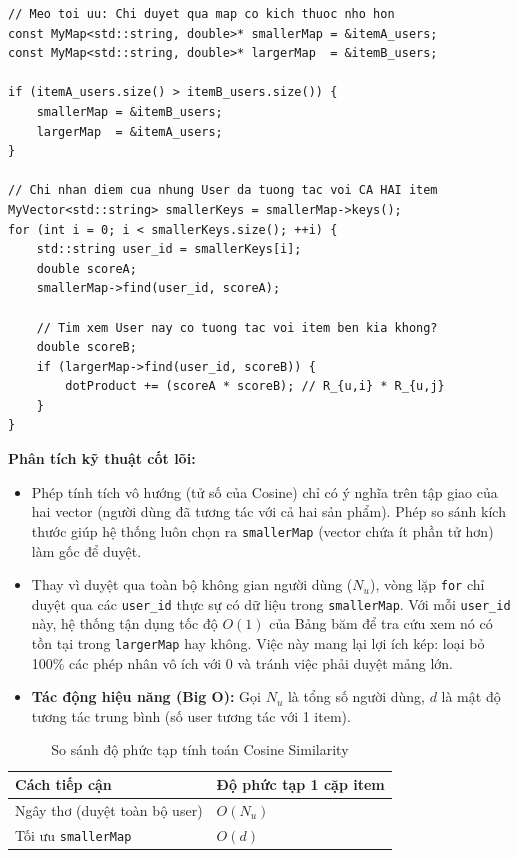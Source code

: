 \documentclass{report}
\begin{document}
\begin{lstlisting}[caption={Kỹ thuật smallerMap trong SimilarityMatrix::calculateCosine() (File SimilarityMatrix.cpp)}, label={lst:smallermap}]
// Meo toi uu: Chi duyet qua map co kich thuoc nho hon
const MyMap<std::string, double>* smallerMap = &itemA_users;
const MyMap<std::string, double>* largerMap  = &itemB_users;

if (itemA_users.size() > itemB_users.size()) {
    smallerMap = &itemB_users;
    largerMap  = &itemA_users;
}

// Chi nhan diem cua nhung User da tuong tac voi CA HAI item
MyVector<std::string> smallerKeys = smallerMap->keys();
for (int i = 0; i < smallerKeys.size(); ++i) {
    std::string user_id = smallerKeys[i];
    double scoreA;
    smallerMap->find(user_id, scoreA);

    // Tim xem User nay co tuong tac voi item ben kia khong?
    double scoreB;
    if (largerMap->find(user_id, scoreB)) {
        dotProduct += (scoreA * scoreB); // R_{u,i} * R_{u,j}
    }
}
\end{lstlisting}

\vspace{0.3cm}
\textbf{Phân tích kỹ thuật cốt lõi:}
\begin{itemize}
    \item[\textbf{a)}] Phép tính tích vô hướng (tử số của Cosine) chỉ có ý nghĩa trên tập giao của hai vector (người dùng đã tương tác với cả hai sản phẩm). Phép so sánh kích thước giúp hệ thống luôn chọn ra \texttt{smallerMap} (vector chứa ít phần tử hơn) làm gốc để duyệt.
    \item[\textbf{b)}] Thay vì duyệt qua toàn bộ không gian người dùng ($N_u$), vòng lặp \texttt{for} chỉ duyệt qua các \texttt{user\_id} thực sự có dữ liệu trong \texttt{smallerMap}. Với mỗi \texttt{user\_id} này, hệ thống tận dụng tốc độ $O(1)$ của Bảng băm để tra cứu xem nó có tồn tại trong \texttt{largerMap} hay không. Việc này mang lại lợi ích kép: loại bỏ 100\% các phép nhân vô ích với 0 và tránh việc phải duyệt mảng lớn.
    \item[\textbf{c)}] \textbf{Tác động hiệu năng (Big O):} Gọi $N_u$ là tổng số người dùng, $d$ là mật độ tương tác trung bình (số user tương tác với 1 item).
\end{itemize}

\begin{table}[H]
    \centering
    \renewcommand{\arraystretch}{1.5}
    \begin{tabularx}{\textwidth}{|>{\centering\arraybackslash}X|>{\centering\arraybackslash}X|}
        \hline
        \textbf{Cách tiếp cận} & \textbf{Độ phức tạp 1 cặp item} \\ \hline
        Ngây thơ (duyệt toàn bộ user) & $O(N_u)$ \\ \hline
        Tối ưu \texttt{smallerMap} & $O(d)$ \\ \hline
    \end{tabularx}
    \caption{So sánh độ phức tạp tính toán Cosine Similarity}
    \label{tab:cosine_optimization}
\end{table}
\end{document}
